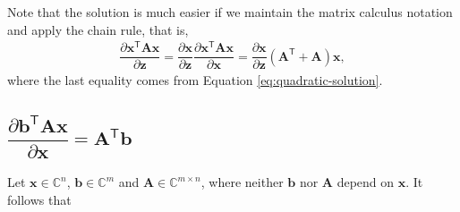 \documentclass{article}
\newcommand{\trans}{\mathsf{T}}
\begin{document}
Note that the solution is much easier if we maintain the matrix calculus notation and apply the chain rule, that is,
\begin{align}
    \dfrac{\partial \mathbf{x}^\trans \mathbf{A} \mathbf{x}}{\partial \mathbf{z}} = \dfrac{\partial \mathbf{x}}{\partial \mathbf{z}} \dfrac{\partial \mathbf{x}^\trans \mathbf{A} \mathbf{x}}{\partial \mathbf{x}} = \dfrac{\partial \mathbf{x}}{\partial \mathbf{z}} \left(\mathbf{A}^\trans + \mathbf{A}\right) \mathbf{x},
\end{align}
where the last equality comes from Equation \eqref{eq:quadratic-solution}.

\subsection{\(\dfrac{\partial \mathbf{b}^\trans \mathbf{A} \mathbf{x}}{\partial \mathbf{x}} = \mathbf{A}^\trans \mathbf{b}\)} \label{sec:bt-A-x}
Let \(\mathbf{x} \in \mathbb{C}^{n}\), \(\mathbf{b} \in \mathbb{C}^{m}\) and \(\mathbf{A}\in \mathbb{C}^{m\times n}\), where neither \(\mathbf{b}\) nor \(\mathbf{A}\) depend on \(\mathbf{x}\). It follows that
\end{document}
